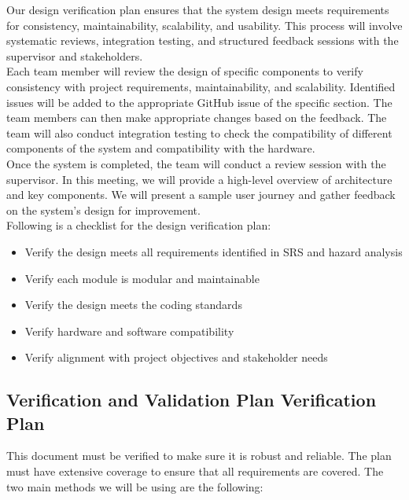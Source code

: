 \documentclass[12pt, titlepage]{article}
\begin{document}
Our design verification plan ensures that the system design meets requirements for consistency, maintainability, scalability, and usability. This process will involve systematic reviews, integration testing, and structured feedback sessions with the supervisor and stakeholders.\\
Each team member will review the design of specific components to verify consistency with project requirements, maintainability, and scalability. Identified issues will be added to the appropriate GitHub issue of the specific section. The team members can then make appropriate changes based on the feedback. The team will also conduct integration testing to check the compatibility of different components of the system and compatibility with the hardware.\\
Once the system is completed, the team will conduct a review session with the supervisor. In this meeting, we will provide a high-level overview of architecture and key components. We will present a sample user journey and gather feedback on the system's design for improvement. \\

Following is a checklist for the design verification plan: 
\begin{itemize}
  \item Verify the design meets all requirements identified in SRS and hazard analysis
  \item Verify each module is modular and maintainable
  \item Verify the design meets the coding standards
  \item Verify hardware and software compatibility
  \item Verify alignment with project objectives and stakeholder needs
\end{itemize}

\subsection{Verification and Validation Plan Verification Plan} \label{section:3.4}

This document must be verified to make sure it is robust and reliable. The plan must have extensive coverage to ensure that all requirements are covered. The two main methods we will be using are the following:
\end{document}
